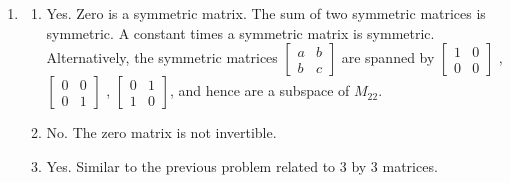 {\begin{multicols}{2}
\begin{enumerate}
\begin{enumerate}
\begin{enumerate}
	\item 
	The span of 
	$\begin{bmatrix}
	1&0&0\\
	0&0&0\\
	0&0&0
	\end{bmatrix}$,
	$\begin{bmatrix}
	0&1&0\\
	0&0&0\\
	0&0&0
	\end{bmatrix}$,
	$\begin{bmatrix}
	0&0&1\\
	0&0&0\\
	0&0&0
	\end{bmatrix}$,
	$\begin{bmatrix}
	0&0&0\\
	0&1&0\\
	0&0&0
	\end{bmatrix}$,
	$\begin{bmatrix}
	0&0&0\\
	0&0&1\\
	0&0&0
	\end{bmatrix}$,
	$\begin{bmatrix}
	0&0&0\\
	0&0&0\\
	0&0&1
	\end{bmatrix}$
	is the set of upper triangular matrices
  $\begin{bmatrix}
	a&b&c\\
	0&d&e\\
	0&0&f
	\end{bmatrix}$.

	
\end{enumerate}
	\item 
		\begin{enumerate}
			\item 
			Yes. Zero is a symmetric matrix. The sum of two symmetric matrices is symmetric. A constant times a symmetric matrix is symmetric.  Alternatively, the symmetric matrices 
	$\begin{bmatrix}
	a&b\\
	b&c
	\end{bmatrix}$
are spanned by 
	$\begin{bmatrix}
	1&0\\
	0&0
	\end{bmatrix}$
,
	$\begin{bmatrix}
	0&0\\
	0&1
	\end{bmatrix}$
, 
	$\begin{bmatrix}
	0&1\\
	1&0
	\end{bmatrix}$, and hence are a subspace of $M_22$.
			\item	No. The zero matrix is not invertible. 
			\item Yes. Similar to the previous problem related to 3 by 3 matrices.
		\end{enumerate}


\end{enumerate}
\end{enumerate}
\end{multicols}}
